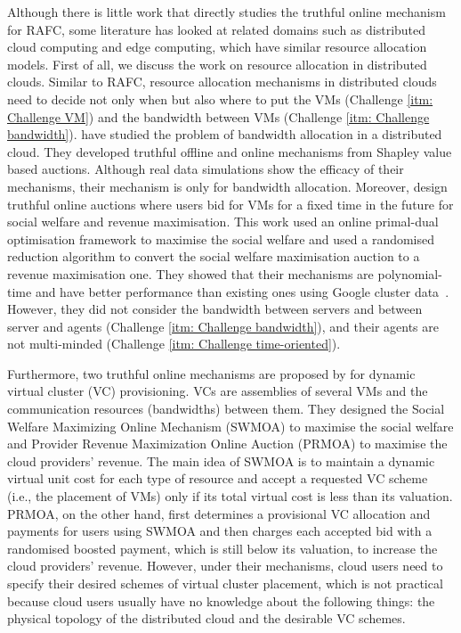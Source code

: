 \documentclass[11pt]{phdthesis}
\begin{document}
Although there is little work that directly studies the truthful online mechanism for RAFC, some literature has looked at related domains such as distributed cloud computing and edge computing, which have similar resource allocation models. First of all, we discuss the work on resource allocation in distributed clouds. Similar to RAFC, resource allocation mechanisms in distributed clouds need to decide not only when but also where to put the VMs (Challenge \ref{itm: Challenge VM}) and the bandwidth between VMs (Challenge \ref{itm: Challenge bandwidth}). \citet{shi2015shapley} have studied the problem of bandwidth allocation in a distributed cloud. They developed truthful offline and online mechanisms from Shapley value based auctions. Although real data simulations show the efficacy of their mechanisms, their mechanism is only for bandwidth allocation. Moreover, \citet{zhang2015online} design truthful online auctions where users bid for VMs for a fixed time in the future for social welfare and revenue maximisation. This work used an online primal-dual optimisation framework to maximise the social welfare and used a randomised reduction algorithm to convert the social welfare maximisation auction to a revenue maximisation one. They showed that their mechanisms are polynomial-time and have better performance than existing ones using Google cluster data~\citep{reiss2011google}. However, they did not consider the bandwidth between servers and between server and agents (Challenge \ref{itm: Challenge bandwidth}), and their agents are not multi-minded (Challenge \ref{itm: Challenge time-oriented}). 

Furthermore, two truthful online mechanisms are proposed by \citet{shi2017online} for dynamic virtual cluster (VC) provisioning. VCs are assemblies of several VMs and the communication resources (bandwidths) between them. They designed the Social Welfare Maximizing Online Mechanism (SWMOA) to maximise the social welfare and Provider Revenue Maximization Online Auction (PRMOA) to maximise the cloud providers' revenue. The main idea of SWMOA is to maintain a dynamic virtual unit cost for each type of resource and accept a requested VC scheme (i.e., the placement of VMs) only if its total virtual cost is less than its valuation. PRMOA, on the other hand, first determines a provisional VC allocation and payments for users using SWMOA and then charges each accepted bid with a randomised boosted payment, which is still below its valuation, to increase the cloud providers' revenue. However, under their mechanisms, cloud users need to specify their desired schemes of virtual cluster placement, which is not practical because cloud users usually have no knowledge about the following things: the physical topology of the distributed cloud and the desirable VC schemes. 
\end{document}
